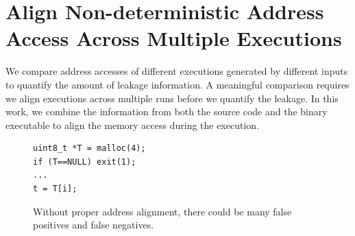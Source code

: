 \section{Align Non-deterministic Address Access Across Multiple Executions}
We compare address accesses of different executions generated by different inputs to quantify the amount of leakage information. A meaningful comparison requires we align executions across multiple runs before we quantify the leakage. In this work, we combine the information from both the source code and the binary executable to align the memory access during the execution.


\begin{figure}[h]
  \begin{minipage}{0.45\linewidth}
    \begin{lstlisting}[numbers=none]
uint8_t *T = malloc(4);
if (T==NULL) exit(1);
...
t = T[i];    
\end{lstlisting}
  \end{minipage}
  \hfill
  \begin{minipage}{0.6\linewidth}
  \end{minipage}
  \caption{Without proper address alignment, there could be many false positives and false negatives.}\label{fig:align}
\end{figure}

